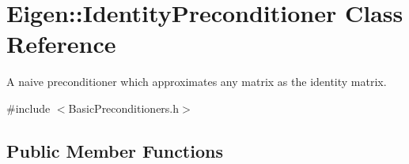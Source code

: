 \hypertarget{class_eigen_1_1_identity_preconditioner}{}\section{Eigen\+::Identity\+Preconditioner Class Reference}
\label{class_eigen_1_1_identity_preconditioner}


A naive preconditioner which approximates any matrix as the identity matrix.  




{\ttfamily \#include $<$Basic\+Preconditioners.\+h$>$}

\subsection*{Public Member Functions}
